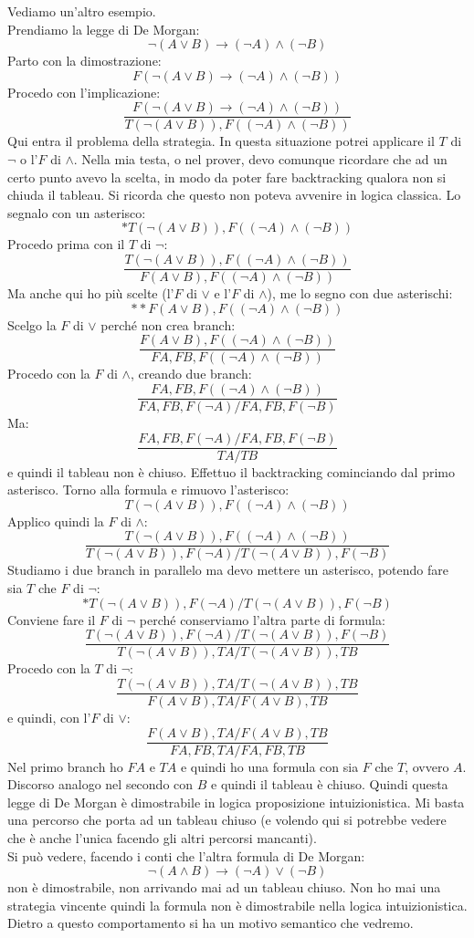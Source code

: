 \documentclass[a4paper,12pt, oneside]{book}
\begin{document}
\begin{esempio}
  Vediamo un'altro esempio.\\
  Prendiamo la legge di De Morgan:
  \[\neg (A\lor B)\to (\neg A)\land (\neg B)\]
  Parto con la dimostrazione:
  \[F(\neg (A\lor B)\to (\neg A)\land (\neg B))\]
  Procedo con l'implicazione:
  \[\frac{F(\neg (A\lor B)\to (\neg A)\land (\neg B))}{T(\neg (A\lor B)),F((\neg
      A)\land (\neg B))}\]
  Qui entra il problema della strategia. In questa situazione potrei applicare
  il $T$ di $\neg$ o l'$F$ di $\land$. Nella mia testa, o nel prover, devo
  comunque ricordare che ad un certo punto avevo la scelta, in modo da poter
  fare backtracking qualora non si chiuda il tableau. Si ricorda che questo non
  poteva avvenire in logica classica. Lo segnalo con un
  asterisco:
  \[*T(\neg (A\lor B)),F((\neg A)\land (\neg B))\]
  Procedo prima con il $T$ di $\neg$:
  \[\frac{T(\neg (A\lor B)),F((\neg A)\land (\neg B))}{F(A\lor B), F((\neg
      A)\land (\neg B))}\]
  Ma anche qui ho più scelte (l'$F$ di $\lor$ e l'$F$ di $\land$), me lo segno
  con due asterischi: 
  \[**F(A\lor B), F((\neg A)\land (\neg B))\]
  Scelgo la $F$ di $\lor$ perché non crea branch:
  \[\frac{F(A\lor B), F((\neg A)\land (\neg B))}{FA, FB, F((\neg A)\land (\neg
      B))}\]
  Procedo con la $F$ di $\land$, creando due branch:
  \[\frac{FA, FB, F((\neg A)\land (\neg B))}{FA, FB, F(\neg A)/ FA, FB, F(\neg
      B)}\]
  Ma:
  \[\frac{FA, FB, F(\neg A)/ FA, FB, F(\neg B)}{TA/TB}\]
  e quindi il tableau non è chiuso. Effettuo il backtracking cominciando dal
  primo asterisco. Torno alla formula e rimuovo l'asterisco:
  \[T(\neg (A\lor B)),F((\neg A)\land (\neg B))\]
  Applico quindi la $F$ di $\land$:
  \[\frac{T(\neg (A\lor B)),F((\neg A)\land (\neg B))}{T(\neg (A\lor B)),F(\neg
      A)/T(\neg (A\lor B)),F(\neg B)}\]
  Studiamo i due branch in parallelo ma devo mettere un asterisco, potendo fare
  sia $T$ che $F$ di $\neg$:
  \[*T(\neg (A\lor B)),F(\neg A)/T(\neg (A\lor B)),F(\neg B)\]
  Conviene fare il $F$ di $\neg$ perché conserviamo l'altra parte di formula:
  \[\frac{T(\neg (A\lor B)),F(\neg A)/T(\neg (A\lor B)),F(\neg B)}{T(\neg (A\lor
      B)),TA/T(\neg (A\lor B)),TB}\] 
  Procedo con la $T$ di $\neg$:
  \[\frac{T(\neg (A\lor B)),TA/T(\neg (A\lor B)),TB}{F(A\lor B),TA/F(A\lor B),
      TB}\]
  e quindi, con l'$F$ di $\lor$:
  \[\frac{F(A\lor B),TA/F(A\lor B), TB}{FA,FB,TA/FA,FB,TB}\]
  Nel primo branch ho $FA$ e $TA$ e quindi ho una formula con sia $F$ che $T$,
  ovvero $A$. Discorso analogo nel secondo con $B$ e quindi il tableau è
  chiuso. Quindi questa legge di De Morgan è dimostrabile in logica
  proposizione intuizionistica. Mi basta una percorso che porta ad un
  tableau chiuso (e volendo qui si potrebbe vedere che è anche l'unica facendo
  gli altri percorsi mancanti). \\
  Si può vedere, facendo i conti che l'altra formula di De Morgan:
  \[\neg (A\land B)\to (\neg A)\lor (\neg B)\]
  non è dimostrabile, non arrivando mai ad un tableau chiuso. Non ho mai una
  strategia vincente  quindi la formula non è dimostrabile nella logica
  intuizionistica. Dietro a questo comportamento si ha un motivo semantico che
  vedremo.  
\end{esempio}
\end{document}
